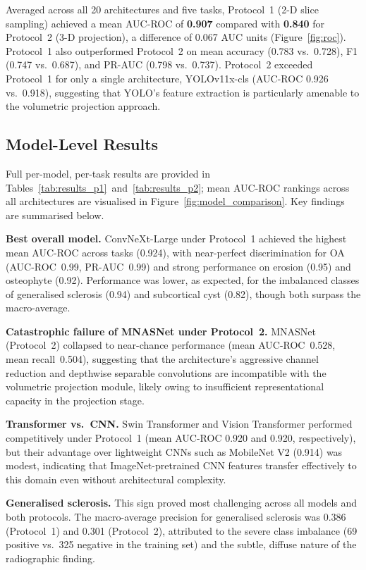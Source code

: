 \documentclass[review,12pt]{elsarticle}
\begin{document}
Averaged across all 20 architectures and five tasks, Protocol~1
(2-D slice sampling) achieved a mean AUC-ROC of \textbf{0.907} compared
with \textbf{0.840} for Protocol~2 (3-D projection), a difference of
0.067 AUC units (Figure~\ref{fig:roc}). Protocol~1 also outperformed Protocol~2 on mean
accuracy (0.783 vs.\ 0.728), F1 (0.747 vs.\ 0.687), and PR-AUC
(0.798 vs.\ 0.737). Protocol~2 exceeded Protocol~1 for only a single
architecture, YOLOv11x-cls (AUC-ROC 0.926 vs.\ 0.918), suggesting that
YOLO's feature extraction is particularly amenable to the volumetric
projection approach.

\subsection{Model-Level Results}
\label{sec:model_results}

Full per-model, per-task results are provided in
Tables~\ref{tab:results_p1}~and~\ref{tab:results_p2}; mean AUC-ROC rankings across all architectures
are visualised in Figure~\ref{fig:model_comparison}. Key findings are
summarised below.

\textbf{Best overall model.} ConvNeXt-Large under Protocol~1 achieved
the highest mean AUC-ROC across tasks (0.924), with near-perfect
discrimination for OA (AUC-ROC~0.99, PR-AUC~0.99) and strong
performance on erosion (0.95) and osteophyte (0.92). Performance was
lower, as expected, for the imbalanced classes of generalised sclerosis
(0.94) and subcortical cyst (0.82), though both surpass the macro-average.

\textbf{Catastrophic failure of MNASNet under Protocol~2.}
MNASNet (Protocol~2) collapsed to near-chance performance
(mean AUC-ROC~0.528, mean recall~0.504), suggesting that the
architecture's aggressive channel reduction and depthwise separable
convolutions are incompatible with the volumetric projection module,
likely owing to insufficient representational capacity in the projection
stage.

\textbf{Transformer vs.\ CNN.} Swin Transformer and Vision Transformer
performed competitively under Protocol~1 (mean AUC-ROC 0.920 and 0.920,
respectively), but their advantage over lightweight CNNs such as
MobileNet V2 (0.914) was modest, indicating that ImageNet-pretrained
CNN features transfer effectively to this domain even without
architectural complexity.

\textbf{Generalised sclerosis.} This sign proved most challenging across
all models and both protocols. The macro-average precision for
generalised sclerosis was 0.386 (Protocol~1) and 0.301 (Protocol~2),
attributed to the severe class imbalance (69 positive vs.\ 325 negative
in the training set) and the subtle, diffuse nature of the radiographic
finding.
\end{document}
